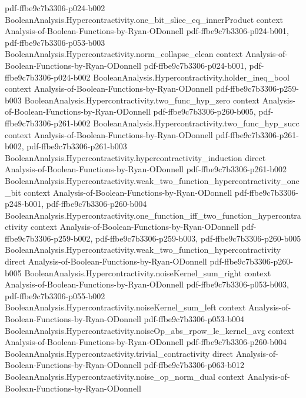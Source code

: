 \begin{theorem}
{    pdf-ffbe9c7b3306-p024-b002}
\proofstep
  {BooleanAnalysis.Hypercontractivity.one_bit_slice_eq_innerProduct}
  {context}
  {Analysis-of-Boolean-Functions-by-Ryan-ODonnell}
  {pdf-ffbe9c7b3306-p024-b001,
    pdf-ffbe9c7b3306-p053-b003}
\proofstep
  {BooleanAnalysis.Hypercontractivity.norm_collapse_clean}
  {context}
  {Analysis-of-Boolean-Functions-by-Ryan-ODonnell}
  {pdf-ffbe9c7b3306-p024-b001,
    pdf-ffbe9c7b3306-p024-b002}
\proofstep
  {BooleanAnalysis.Hypercontractivity.holder_ineq_bool}
  {context}
  {Analysis-of-Boolean-Functions-by-Ryan-ODonnell}
  {pdf-ffbe9c7b3306-p259-b003}
\proofstep
  {BooleanAnalysis.Hypercontractivity.two_func_hyp_zero}
  {context}
  {Analysis-of-Boolean-Functions-by-Ryan-ODonnell}
  {pdf-ffbe9c7b3306-p260-b005,
    pdf-ffbe9c7b3306-p261-b002}
\proofstep
  {BooleanAnalysis.Hypercontractivity.two_func_hyp_succ}
  {context}
  {Analysis-of-Boolean-Functions-by-Ryan-ODonnell}
  {pdf-ffbe9c7b3306-p261-b002,
    pdf-ffbe9c7b3306-p261-b003}
\proofstep
  {BooleanAnalysis.Hypercontractivity.hypercontractivity_induction}
  {direct}
  {Analysis-of-Boolean-Functions-by-Ryan-ODonnell}
  {pdf-ffbe9c7b3306-p261-b002}
\proofstep
  {BooleanAnalysis.Hypercontractivity.weak_two_function_hypercontractivity_one_bit}
  {context}
  {Analysis-of-Boolean-Functions-by-Ryan-ODonnell}
  {pdf-ffbe9c7b3306-p248-b001,
    pdf-ffbe9c7b3306-p260-b004}
\proofstep
  {BooleanAnalysis.Hypercontractivity.one_function_iff_two_function_hypercontractivity}
  {context}
  {Analysis-of-Boolean-Functions-by-Ryan-ODonnell}
  {pdf-ffbe9c7b3306-p259-b002,
    pdf-ffbe9c7b3306-p259-b003,
    pdf-ffbe9c7b3306-p260-b005}
\proofstep
  {BooleanAnalysis.Hypercontractivity.weak_two_function_hypercontractivity}
  {direct}
  {Analysis-of-Boolean-Functions-by-Ryan-ODonnell}
  {pdf-ffbe9c7b3306-p260-b005}
\proofstep
  {BooleanAnalysis.Hypercontractivity.noiseKernel_sum_right}
  {context}
  {Analysis-of-Boolean-Functions-by-Ryan-ODonnell}
  {pdf-ffbe9c7b3306-p053-b003,
    pdf-ffbe9c7b3306-p055-b002}
\proofstep
  {BooleanAnalysis.Hypercontractivity.noiseKernel_sum_left}
  {context}
  {Analysis-of-Boolean-Functions-by-Ryan-ODonnell}
  {pdf-ffbe9c7b3306-p053-b004}
\proofstep
  {BooleanAnalysis.Hypercontractivity.noiseOp_abs_rpow_le_kernel_avg}
  {context}
  {Analysis-of-Boolean-Functions-by-Ryan-ODonnell}
  {pdf-ffbe9c7b3306-p260-b004}
\proofstep
  {BooleanAnalysis.Hypercontractivity.trivial_contractivity}
  {direct}
  {Analysis-of-Boolean-Functions-by-Ryan-ODonnell}
  {pdf-ffbe9c7b3306-p063-b012}
\proofstep
  {BooleanAnalysis.Hypercontractivity.noise_op_norm_dual}
  {context}
  {Analysis-of-Boolean-Functions-by-Ryan-ODonnell}

\end{theorem}
